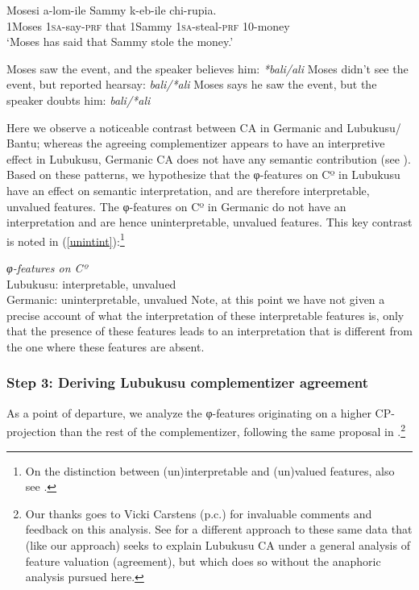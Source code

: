 \documentclass[output=paper
,modfonts
,nonflat
]{langsci/langscibook}
\begin{document}
\ea
\gll Mosesi a-lom-ile \underline{} Sammy k-eb-ile chi-rupia. \\
1Moses 1\textsc{sa}-say-\textsc{prf} that 1Sammy 1\textsc{sa}-steal-\textsc{prf} 10-money \\
\glt `Moses has said that Sammy stole the money.'
\begin{xlist}
\ex Moses saw the event, and the speaker believes him: \textit{*bali/ali}
\ex Moses didn't see the event, but reported hearsay: \textit{bali/*ali}
\ex Moses says he saw the event, but the speaker doubts him: \textit{bali/*ali}
\end{xlist}
\z
\noindent
Here we observe a noticeable contrast between CA in Germanic and Lubukusu/ Bantu; whereas the agreeing complementizer appears to have an interpretive effect in Lubukusu, Germanic CA does not have any semantic contribution (see \citealt{vanKoppen:2005,vanKoppen:2017}). Based on these patterns, we hypothesize that the φ-features on Cº in Lubukusu have an effect on semantic interpretation, and are therefore interpretable, unvalued features. The φ-features on Cº in Germanic do not have an interpretation and are hence uninterpretable, unvalued features. This key contrast is noted in (\ref{unintint}):\footnote{On the distinction between (un)interpretable and (un)valued features, also see \citet{Pesetsky:2007}.}

\ea \label{unintint}
\textit{φ-features on Cº} \\
Lubukusu: interpretable, unvalued \\
Germanic: uninterpretable, unvalued
\z
\noindent Note, at this point we have not given a precise account of what the interpretation of these interpretable features is, only that the presence of these features leads to an interpretation that is different from the one where these features are absent.   

\subsubsection{Step 3: Deriving Lubukusu complementizer agreement}

As a point of departure, we analyze the φ-features originating on a higher CP-projection than the rest of the complementizer, following the same proposal in \citet{Carstens:2016}.\footnote{Our thanks goes to Vicki Carstens (p.c.) for invaluable comments and feedback on this analysis. See \citet{Carstens:2016} for a different approach to these same data that (like our approach) seeks to explain Lubukusu CA under a general analysis of feature valuation (agreement), but which does so without the anaphoric analysis pursued here.}
\end{document}
